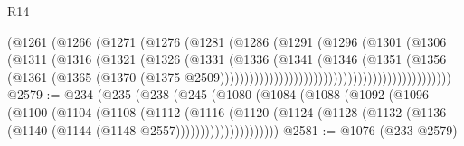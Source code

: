 \begin{lexlean}{R14}
\begin{coremodule}
                                                  (@1261
                                                    (@1266
                                                      (@1271
                                                        (@1276
                                                          (@1281
                                                            (@1286
                                                              (@1291
                                                                (@1296
                                                                  (@1301
                                                                    (@1306
                                                                      (@1311
                                                                        (@1316
                                                                          (@1321
                                                                            (@1326
                                                                              (@1331
                                                                                (@1336
                                                                                  (@1341
                                                                                    (@1346
                                                                                      (@1351
                                                                                        (@1356
                                                                                          (@1361
                                                                                            (@1365
                                                                                              (@1370
                                                                                                (@1375
                                                                                                  @2509)))))))))))))))))))))))))))))))))))))))))))))))
@2579 := @234
    (@235
      (@238
        (@245
          (@1080
            (@1084
              (@1088
                (@1092
                  (@1096
                    (@1100
                      (@1104
                        (@1108
                          (@1112
                            (@1116
                              (@1120
                                (@1124
                                  (@1128
                                    (@1132 (@1136 (@1140 (@1144 (@1148 @2557)))))))))))))))))))))
@2581 := @1076 (@233 @2579)

\end{coremodule}
\end{lexlean}
